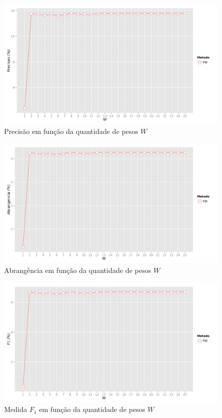 {\begin{figure}[hp]
    \begin{center}
    \includegraphics[width=1\textwidth]{img/precision_W}
    \end{center}
    \caption{Precisão em função da quantidade de pesos $W$}
    \label{fig:precision_W}
\end{figure}


\begin{figure}[hp]
    \begin{center}
    \includegraphics[width=1\textwidth]{img/recall_W}
    \end{center}
    \caption{Abrangência em função da quantidade de pesos $W$}
    \label{fig:recall_W}
\end{figure}

\begin{figure}[hp]
    \begin{center}
    \includegraphics[width=1\textwidth]{img/F1_W}
    \end{center}
    \caption{Medida $F_1$ em função da quantidade de pesos $W$}
    \label{fig:F1_W}
\end{figure}

}
